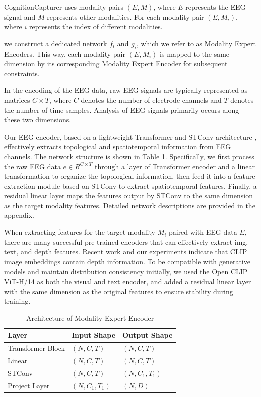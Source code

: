 \documentclass[letterpaper]{article} %
\begin{document}
CognitionCapturer uses modality pairs $(E, M)$, where $E$ represents the EEG signal and $M$ represents other modalities. For each modality pair $(E, M_{i})$, where $i$ represents the index of different modalities.

we construct a dedicated network $f_{i}$ and $g_{i}$, which we refer to as Modality Expert Encoders. This way, each modality pair $(E, M_{i})$ is mapped to the same dimension by its corresponding Modality Expert Encoder for subsequent constraints. 

In the encoding of the EEG data, raw EEG signals are typically represented as matrices $C \times T$, where $C$ denotes the number of electrode channels and $T$ denotes the number of time samples. Analysis of EEG signals primarily occurs along these two dimensions.

Our EEG encoder, based on a lightweight Transformer and STConv architecture \cite{li2024visualdecodingreconstructioneeg, vaswani2017attention}, effectively extracts topological and spatiotemporal information from EEG channels. The network structure is shown in Table \ref{model archi}. Specifically, we first process the raw EEG data  $e \in R^{ C \times T}$ through a layer of Transformer encoder and a linear transformation to organize the topological information, then feed it into a feature extraction module based on STConv to extract spatiotemporal features. Finally, a residual linear layer maps the features output by STConv to the same dimension as the target modality features. Detailed network descriptions are provided in the appendix. 

When extracting features for the target modality $ M_{i}$ paired with EEG data $E$, there are many successful pre-trained encoders that can effectively extract img, text, and depth features. Recent work \cite{zhang2022can} and our experiments indicate that CLIP image embeddings contain depth information. To be compatible with generative models and maintain distribution consistency initially, we used the Open CLIP ViT-H/14 \cite{radford2021learning} as both the visual and text encoder, and added a residual linear layer with the same dimension as the original features to ensure stability during training. 

\begin{table}[ht]
\centering
\begin{tabular}{lll}
\hline
Layer & Input Shape & Output Shape \\ \hline
Transformer Block & $(N, C, T)$& $(N, C, T)$ \\
Linear & $(N, C, T)$ & $(N, C, T)$ \\
STConv & $(N, C, T)$ & $(N, C_1, T_1)$ \\
Project Layer & $(N, C_1, T_1)$ & $(N, D)$ \\ \hline
\end{tabular}
\caption{Architecture of Modality Expert Encoder}
\label{model archi}
\end{table}
\end{document}
